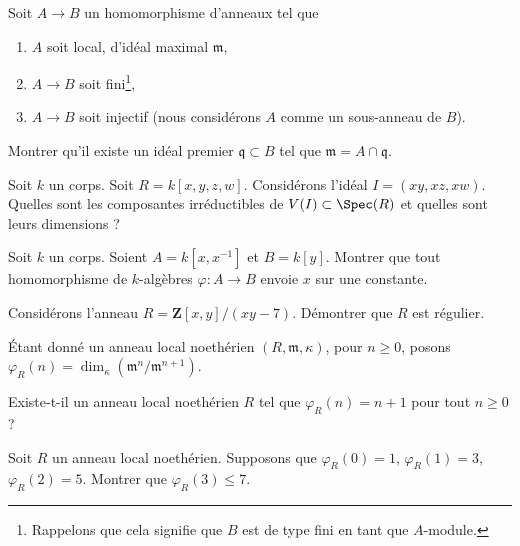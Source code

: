 \begin{exercise}
\label{exercise-finite-injective}
Soit $A \to B$ un homomorphisme d'anneaux tel que
\begin{enumerate}
\item $A$ soit local, d'idéal maximal $\mathfrak m$,
\item $A \to B$ soit fini\footnote{Rappelons que cela signifie que $B$
est de type fini en tant que $A$-module.},
\item $A \to B$ soit injectif (nous considérons $A$ comme un sous-anneau de $B$).
\end{enumerate}
Montrer qu'il existe un idéal premier $\mathfrak q \subset B$ tel que
$\mathfrak m = A \cap \mathfrak q$.
\end{exercise}

\begin{exercise}
\label{exercise-find-components}
Soit $k$ un corps. Soit $R = k[x, y, z, w]$.
Considérons l'idéal $I = (xy, xz, xw)$.
Quelles sont les composantes irréductibles de
$V(I) \subset \Spec(R)$ et quelles sont leurs dimensions ?
\end{exercise}

\begin{exercise}
\label{exercise-no-nonconstant-morphism}
Soit $k$ un corps. Soient $A = k[x, x^{-1}]$ et $B = k[y]$.
Montrer que tout homomorphisme de $k$-algèbres $\varphi : A \to B$ envoie $x$ sur une constante.
\end{exercise}

\begin{exercise}
\label{exercise-regular-over-Z}
Considérons l'anneau $R = \mathbf{Z}[x, y]/(xy - 7)$.
Démontrer que $R$ est régulier.
\end{exercise}

\noindent
Étant donné un anneau local noethérien $(R, \mathfrak m, \kappa)$,
pour $n \geq 0$, posons
$\varphi_R(n) = \dim_\kappa(\mathfrak m^n/\mathfrak m^{n + 1})$.

\begin{exercise}
\label{exercise-hilbert-function-allowed}
Existe-t-il un anneau local noethérien $R$ tel que
$\varphi_R(n) = n + 1$ pour tout $n \geq 0$ ?
\end{exercise}

\begin{exercise}
\label{exercise-hilbert-function-prohibited}
Soit $R$ un anneau local noethérien.
Supposons que $\varphi_R(0) = 1$, $\varphi_R(1) = 3$,
$\varphi_R(2) = 5$. Montrer que $\varphi_R(3) \leq 7$.
\end{exercise}





